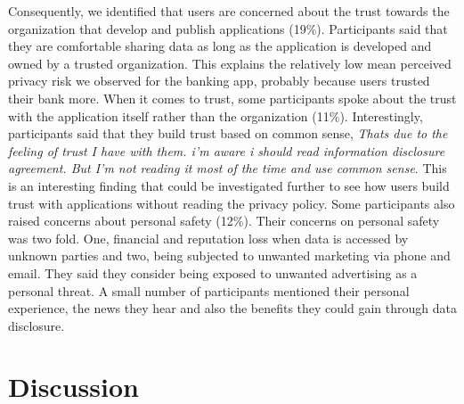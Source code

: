 \documentclass[10pt]{article}
\begin{document}
Consequently, we identified that users are concerned about the trust towards the organization that develop and publish applications (19\%). Participants said that they are comfortable sharing data as long as the application is developed and owned by a trusted organization. This explains the relatively low mean perceived privacy risk we observed for the banking app, probably because users trusted their bank more. When it comes to trust, some participants spoke about the trust with the application itself rather than the organization (11\%). Interestingly, participants said that they build trust based on common sense, \textit {Thats due to the feeling of trust I have with them. i'm aware i should read information disclosure agreement. But I'm not reading it most of the time and use common sense}. This is an interesting finding that could be investigated further to see how users build trust with applications without reading the privacy policy. Some participants also raised concerns about personal safety (12\%). Their concerns on personal safety was two fold. One, financial and reputation loss when data is accessed by unknown parties and two, being subjected to unwanted marketing via phone and email. They said they consider being exposed to unwanted advertising as a personal threat. A small number of participants mentioned their personal experience, the news they hear and also the benefits they could gain through data disclosure.

\section {Discussion}
\end{document}
